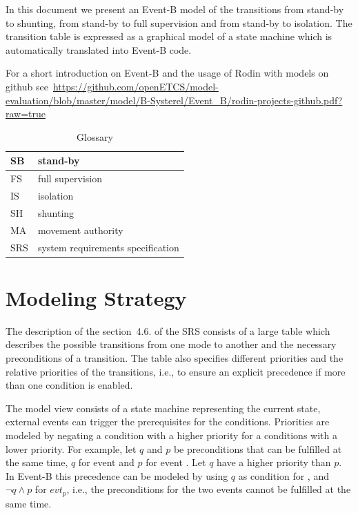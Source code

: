 \documentclass{template/openetcs_article}
\begin{document}
In this document we present an Event-B model of the transitions from stand-by to
shunting, from stand-by to full supervision and from stand-by to isolation. The
transition table is expressed as a graphical model of a state machine which is
automatically translated into Event-B code.

For a short introduction on Event-B and the usage of Rodin with models on github
see~\url{https://github.com/openETCS/model-evaluation/blob/master/model/B-Systerel/Event_B/rodin-projects-github.pdf?raw=true}

\begin{table}[ht]
  \centering
  \begin{tabular}[ht]{|l|l|}
    \hline
    SB & stand-by \\
    \hline
    FS & full supervision \\
    \hline
    IS & isolation \\
    \hline
    SH & shunting \\
    \hline
    MA & movement authority \\
    \hline
    SRS & system requirements specification \\
    \hline
  \end{tabular}
  \caption{Glossary}
  \label{tab:glossary}
\end{table}


\section{Modeling Strategy}
\label{sec:modeling-strategy}

The description of the section~4.6. of the SRS consists of a large table which
describes the possible transitions from one mode to another and the necessary
preconditions of a transition. The table also specifies different priorities and
the relative priorities of the transitions, i.e., to ensure an explicit
precedence if more than one condition is enabled.

The model view consists of a state machine representing the current state,
external events can trigger the prerequisites for the conditions. Priorities are
modeled by negating a condition with a higher priority for a conditions with a
lower priority. For example, let $q$ and $p$ be preconditions that can be
fulfilled at the same time, $q$ for event  and $p$ for event
. Let $q$ have a higher priority than $p$. In Event-B this
precedence can be modeled by using $q$ as condition for , and
$\neg q \wedge p$ for $evt_p$, i.e., the preconditions for the two events cannot
be fulfilled at the same time.
\end{document}
